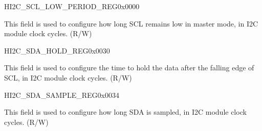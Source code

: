 \begin{register}{H}{I2C\_SCL\_LOW\_PERIOD\_REG}{0x{}0000}\label{regdesc:I2CSCLLOWPERIODREG}
%
%
\regnewline%
\begin{regdesc}\begin{reglist}
\label{fielddesc:I2CSCLLOWPERIOD}\item [I2C\_SCL\_LOW\_PERIOD] This field is used to configure how long SCL remains low in master mode, in I2C module clock cycles. (R/W)
\end{reglist}\end{regdesc}
\end{register}


\begin{register}{H}{I2C\_SDA\_HOLD\_REG}{0x{}0030}\label{regdesc:I2CSDAHOLDREG}
%
%
\regnewline%
\begin{regdesc}\begin{reglist}
\label{fielddesc:I2CSDAHOLDTIME}\item [I2C\_SDA\_HOLD\_TIME] This field is used to configure the time to hold the data after the falling
edge of SCL, in I2C module clock cycles. (R/W)
\end{reglist}\end{regdesc}
\end{register}


\begin{register}{H}{I2C\_SDA\_SAMPLE\_REG}{0x{}0034}\label{regdesc:I2CSDASAMPLEREG}
%
%
\regnewline%
\begin{regdesc}\begin{reglist}
\label{fielddesc:I2CSDASAMPLETIME}\item [I2C\_SDA\_SAMPLE\_TIME] This field is used to configure how long SDA is sampled, in I2C module clock cycles. (R/W)
\end{reglist}\end{regdesc}
\end{register}


